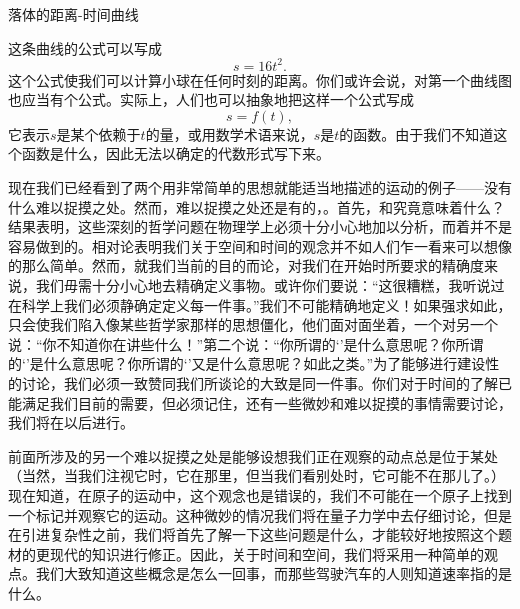 \documentclass[12pt,oneside]{book}
\begin{document}
\begin{fig}{落体的距离-时间曲线}
\caption{落体的距离-时间曲线}
\label{fig:落体的距离-时间曲线}
\end{fig}



这条曲线的公式可以写成
\begin{equation}
\label{Eq:I:8:1}
s=16t^2.
\end{equation}
这个公式使我们可以计算小球在任何时刻的距离。你们或许会说，对第一个曲线图也应当有个公式。实际上，人们也可以抽象地把这样一个公式写成
\begin{equation}
\label{Eq:I:8:2}
s=f(t),
\end{equation}
它表示$s$是某个依赖于$t$的量，或用数学术语来说，$s$是$t$的函数。由于我们不知道这个函数是什么，因此无法以确定的代数形式写下来。

现在我们已经看到了两个用非常简单的思想就能适当地描述的运动的例子——没有什么难以捉摸之处。然而，难以捉摸之处还是有的，。首先，和究竟意味着什么？结果表明，这些深刻的哲学问题在物理学上必须十分小心地加以分析，而着并不是容易做到的。相对论表明我们关于空间和时间的观念并不如人们乍一看来可以想像的那么简单。然而，就我们当前的目的而论，对我们在开始时所要求的精确度来说，我们毋需十分小心地去精确定义事物。或许你们要说：“这很糟糕，我听说过在科学上我们必须静确定定义每一件事。”我们不可能精确地定义！如果强求如此，只会使我们陷入像某些哲学家那样的思想僵化，他们面对面坐着，一个对另一个说：“你不知道你在讲些什么！”第二个说：“你所谓的‘’是什么意思呢？你所谓的‘’是什么意思呢？你所谓的‘’又是什么意思呢？如此之类。”为了能够进行建设性的讨论，我们必须一致赞同我们所谈论的大致是同一件事。你们对于时间的了解已能满足我们目前的需要，但必须记住，还有一些微妙和难以捉摸的事情需要讨论，我们将在以后进行。

前面所涉及的另一个难以捉摸之处是能够设想我们正在观察的动点总是位于某处（当然，当我们注视它时，它在那里，但当我们看别处时，它可能不在那儿了。）现在知道，在原子的运动中，这个观念也是错误的，我们不可能在一个原子上找到一个标记并观察它的运动。这种微妙的情况我们将在量子力学中去仔细讨论，但是在引进复杂性之前，我们将首先了解一下这些问题是什么，才能较好地按照这个题材的更现代的知识进行修正。因此，关于时间和空间，我们将采用一种简单的观点。我们大致知道这些概念是怎么一回事，而那些驾驶汽车的人则知道速率指的是什么。
\end{document}
